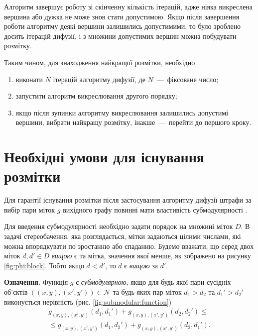 Алгоритм завершує роботу зі скінченну кількість ітерацій,
адже ніяка викреслена вершина або дужка не може знов стати допустимою.
Якщо після завершення роботи алгоритму деякі вершини залишились допустимими,
то було зроблено досить ітерацій дифузії,
і з множини допустимих вершин можна побудувати розмітку.

Таким чином, для знаходження найкращої розмітки, необхідно
\begin{enumerate}
    \item виконати $N$ ітерацій алгоритму дифузії, де $N$~---~фіксоване число;
    \item запустити алгоритм викреслювання другого порядку;
    \item якщо після зупинки алгоритму викреслювання залишились
          допустимі вершини, вибрати найкращу розмітку,
          інакше~---~перейти до першого кроку.
\end{enumerate}

\section{Необхідні умови для існування розмітки}

Для гарантії існування
розмітки після застосування алгоритму дифузії штрафи за вибір пари міток $g$
вихідного графу повинні мати властивість субмодулярності
\cite{diffusion:shlezinger:supermodularity}.

Для введення субмодулярності необхідно задати порядок на множині міток $D$.
В задачі стереобачення, яка розглядається, мітки задаються цілими числами,
які можна впорядкувати по зростанню або спаданню.
Будемо вважати, що серед двох міток $d, d' \in D$ \textit{вищою} є та мітка,
значення якої менше, як зображено на рисунку \ref{fig:phi:block}.
Тобто якщо $d < d'$, то $d$ є \textit{вищою} за $d'$.

\textbf{Означення.}
Функція $g$ є \textit{субмодулярною}, якщо для будь-якої пари сусідніх об'єктів
$\left(\left(x, y \right), \left(x', y' \right) \right) \in \mathcal{N}$
та будь-яких пар міток $d_1 > d_2$ та $d_1' > d_2'$
виконується нерівність (рис. \ref{fig:submodular:function})
\begin{equation} \label{eq:submodular:function}
\begin{gathered}
    g_{\left(x, y \right), \left(x', y' \right)} \left(d_1, d_1' \right) +
    g_{\left(x, y \right), \left(x', y' \right)} \left(d_2, d_2' \right) \le \\
    \le g_{\left(x, y \right), \left(x', y' \right)} \left(d_1, d_2' \right) +
    g_{\left(x, y \right), \left(x', y' \right)} \left(d_2, d_1' \right).
\end{gathered}
\end{equation}

